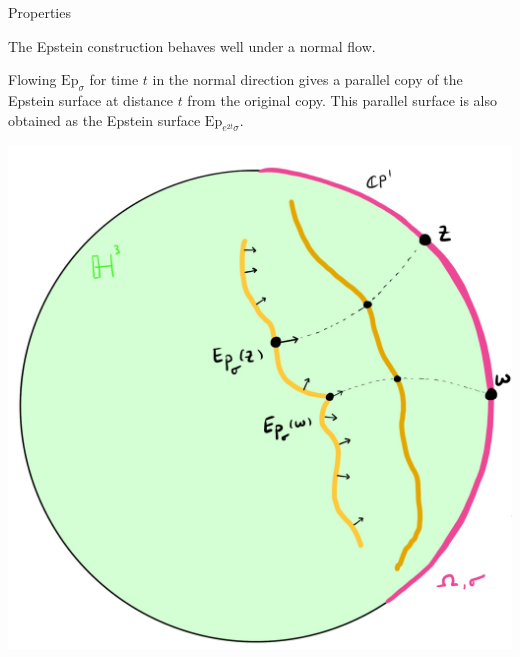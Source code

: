 \documentclass[professionalfont]{beamer}
\begin{document}
\begin{frame}{Properties}

The Epstein construction behaves well under a normal flow. 

Flowing $\mathrm{Ep}_\sigma$ for time $t$ in the normal direction gives a parallel copy of the Epstein surface at distance $t$ from the original copy. This parallel surface is also obtained as the Epstein surface $\mathrm{Ep}_{e^{2t}\sigma}$.

\centering\includegraphics[scale=0.09]{Parallel-9.jpg}

\end{frame}


\end{document}
